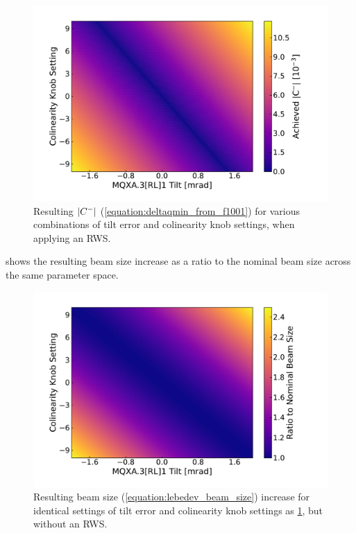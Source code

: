 \begin{figure}[!htb]
    \centering
    \includegraphics*[width=0.9\columnwidth]{Figures/IR_Coupling_Correction/cminus_colin_tilt_compensation_with_waist.pdf}
    \caption{Resulting \(\left\lvert C^{-} \right\rvert\) (\cref{equation:deltaqmin_from_f1001}) for various combinations of tilt error and colinearity knob settings, when applying an RWS.}
    \label{figure:cminus_colin_vs_tilt_with_waist}
\end{figure}

 shows the resulting beam size increase as a ratio to the nominal beam size across the same parameter space.

\begin{figure}[!htb]
    \centering
    \includegraphics*[width=0.9\columnwidth]{Figures/IR_Coupling_Correction/ip_beam_size_growth_colin_tilt_compensation_no_waist.pdf}
    \caption{Resulting beam size (\cref{equation:lebedev_beam_size}) increase for identical settings of tilt error and colinearity knob settings as \cref{figure:cminus_colin_vs_tilt_with_waist}, but without an RWS.}
    \label{figure:beam_size_colin_vs_tilt_no_waist}
\end{figure}


